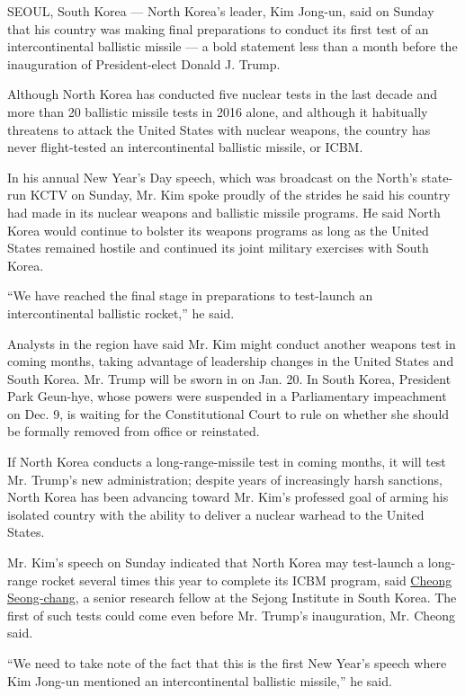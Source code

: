 SEOUL, South Korea --- North Korea's leader, Kim Jong-un, said on Sunday
that his country was making final preparations to conduct its first test
of an intercontinental ballistic missile --- a bold statement less than
a month before the inauguration of President-elect Donald J. Trump.

Although North Korea has conducted five nuclear tests in the last decade
and more than 20 ballistic missile tests in 2016 alone, and although it
habitually threatens to attack the United States with nuclear weapons,
the country has never flight-tested an intercontinental ballistic
missile, or ICBM.

In his annual New Year's Day speech, which was broadcast on the North's
state-run KCTV on Sunday, Mr. Kim spoke proudly of the strides he said
his country had made in its nuclear weapons and ballistic missile
programs. He said North Korea would continue to bolster its weapons
programs as long as the United States remained hostile and continued its
joint military exercises with South Korea.

``We have reached the final stage in preparations to test-launch an
intercontinental ballistic rocket,'' he said.

Analysts in the region have said Mr. Kim might conduct another weapons
test in coming months, taking advantage of leadership changes in the
United States and South Korea. Mr. Trump will be sworn in on Jan. 20. In
South Korea, President Park Geun-hye, whose powers were suspended in a
Parliamentary impeachment on Dec. 9, is waiting for the Constitutional
Court to rule on whether she should be formally removed from office or
reinstated.

If North Korea conducts a long-range-missile test in coming months, it
will test Mr. Trump's new administration; despite years of increasingly
harsh sanctions, North Korea has been advancing toward Mr. Kim's
professed goal of arming his isolated country with the ability to
deliver a nuclear warhead to the United States.

Mr. Kim's speech on Sunday indicated that North Korea may test-launch a
long-range rocket several times this year to complete its ICBM program,
said
\href{http://www.sejong.org/eng/intro/org_view.php?str_bcode=031240003\&str_no=sccheong}{Cheong
Seong-chang}, a senior research fellow at the Sejong Institute in South
Korea. The first of such tests could come even before Mr. Trump's
inauguration, Mr. Cheong said.

``We need to take note of the fact that this is the first New Year's
speech where Kim Jong-un mentioned an intercontinental ballistic
missile,'' he said.

